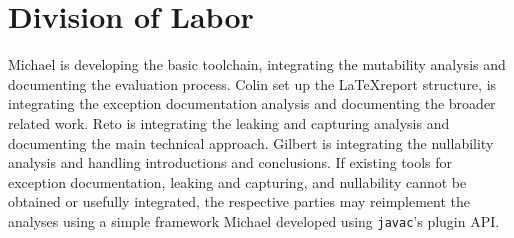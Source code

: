 
\section{Division of Labor}

Michael is developing the basic toolchain, integrating the mutability analysis
and documenting the evaluation process. Colin set up the \LaTeX report
structure, is integrating the exception documentation analysis and documenting
the broader related work. Reto is integrating the leaking and capturing
analysis and documenting the main technical approach. Gilbert is integrating
the nullability analysis and handling introductions and conclusions. If
existing tools for exception documentation, leaking and capturing, and
nullability cannot be obtained or usefully integrated, the respective parties
may reimplement the analyses using a simple framework Michael developed using
\texttt{javac}'s plugin API.
